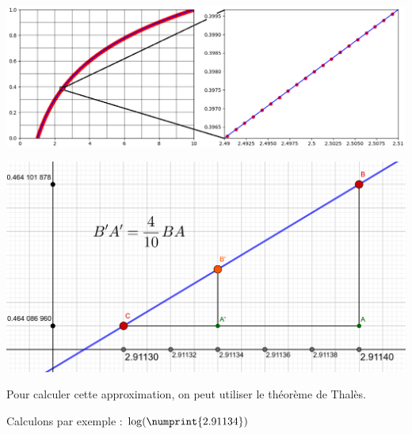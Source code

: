 \documentclass[a4paper]{article}
\begin{document}
\vspace{-1 mm}

\begin{center}
	{              \noindent \includegraphics[scale = 0.45]{Approx log zoom.png } }
	
	{\vspace{3 mm} \noindent \includegraphics[scale = 0.225]{Log/Log Geogebra.png} }
\end{center}

Pour calculer cette approximation, on peut utiliser le théorème de Thalès.

\vspace{1 mm}

{\noindent Calculons par exemple : $\log(\numprint{2.91134})$}

\vspace{1 mm}
\end{document}
